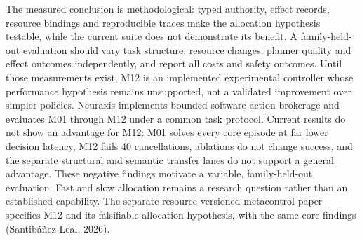 \documentclass[11pt]{article}
\begin{document}
The measured conclusion is methodological: typed authority, effect records, resource bindings and reproducible traces make the allocation hypothesis testable, while the current suite does not demonstrate its benefit. A family-held-out evaluation should vary task structure, resource changes, planner quality and effect outcomes independently, and report all costs and safety outcomes. Until those measurements exist, M12 is an implemented experimental controller whose performance hypothesis remains unsupported, not a validated improvement over simpler policies.
Neuraxis implements bounded software-action brokerage and evaluates M01 through M12 under a common task protocol. Current results do not show an advantage for M12: M01 solves every core episode at far lower decision latency, M12 fails 40 cancellations, ablations do not change success, and the separate structural and semantic transfer lanes do not support a general advantage. These negative findings motivate a variable, family-held-out evaluation. Fast and slow allocation remains a research question rather than an established capability. The separate resource-versioned metacontrol paper specifies M12 and its falsifiable allocation hypothesis, with the same core findings (Santibáñez-Leal, 2026).
\end{document}
